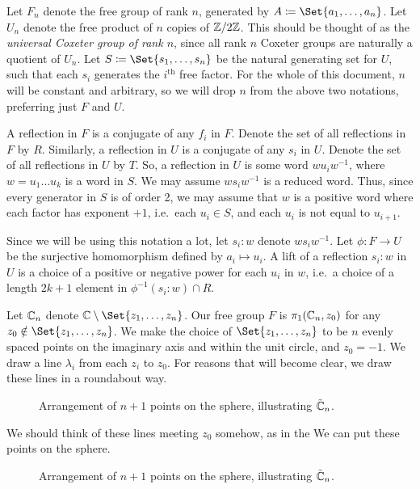 Let $F_n$ denote the free group of rank  $n$, generated by  $A \coloneq \Set{a_1,\ldots,a_n} $.
Let $U_n$ denote the free product of $n$ copies of  $\mathbb{Z} /2\mathbb{Z}$.
This should be thought of as the \emph{universal Coxeter group of rank  $n$}, since all rank  $n$ Coxeter groups are naturally a quotient of  $U_n$.
Let $S \coloneq \Set{s_1,\ldots,s_n} $ be the natural generating set for $U$, such that each  $s_i$ generates the  $i^\text{th}$ free factor.
For the whole of this document,  $n$ will be constant and arbitrary, so we will drop  $n$ from the above two notations, preferring just  $F$ and $U$.

A reflection in $F$ is a conjugate of any $f_i$ in $F$.
Denote the set of all reflections in $F$ by $R$.
Similarly, a reflection in $U$ is a conjugate of  any  $s_i$ in $U$.
Denote the set of all reflections in $U$ by  $T$.
So, a reflection in $U$ is some word $wu_i w^{-1}$, where $w=u_1\ldots u_k$ is a word in $S$.
We may assume $ws_iw^{-1}$ is a reduced word.
Thus, since every generator in $S$ is of order 2, we may assume that $w$ is a positive word where each factor has exponent  $+1$,  i.e.~each $u_i \in S$, and each $u_i$ is not equal to  $u_{i+1}$.

Since we will be using this notation a lot, let $s_i: w$ denote  $ws_iw^{-1}$.
Let $\phi \colon F \to U$ be the surjective homomorphism defined by $a_i \mapsto u_i$.
A lift of a reflection $s_i : w$ in $U$ is a choice of a positive or negative power for each $u_i$ in $w$, i.e.~a choice of a length $2k +1$ element in $\phi^{-1}(s_i : w) \cap R$.

Let $\mathbb{C}_n$ denote $\C \setminus \Set{z_1,\ldots,z_n}$.
Our free group $F$ is $\pi_1(\mathbb{C}_n, z_0)$ for any  $z_0 \notin \Set{z_1,\ldots,z_n} $.
We make the choice of $\Set{z_1,\ldots,z_n}$ to be $n$ evenly spaced points on the imaginary axis and within the unit circle, and $z_0 = -1$.
We draw a line $\lambda_i$ from each  $z_i$ to $z_0$.
For reasons that will become clear, we draw these lines in a roundabout way.

\begin{figure}[h]
	\centering
	
	\caption{Arrangement of $n+1$ points on the sphere, illustrating  $\tilde{\mathbb{C}}_n$.}
\end{figure}

We should think of these lines meeting  $z_0$ somehow, as in the
We can put these points on the sphere.

\begin{figure}[h]
	\centering
	\caption{Arrangement of $n+1$ points on the sphere, illustrating  $\tilde{\mathbb{C}}_n$.}
\end{figure}

